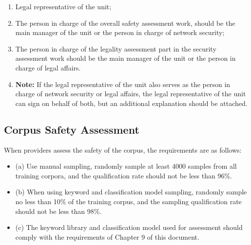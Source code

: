 \documentclass{article}
\begin{document}
\begin{itemize}
    \begin{enumerate}
        \item Legal representative of the unit;
        \item The person in charge of the overall safety assessment work, should be the main manager of the unit or the person in charge of network security;
        \item The person in charge of the legality assessment part in the security assessment work should be the main manager of the unit or the person in charge of legal affairs. 
        \item \textbf{Note:} If the legal representative of the unit also serves as the person in charge of network security or legal affairs, the legal representative of the unit can sign on behalf of both, but an additional explanation should be attached.
    \end{enumerate}
\end{itemize}

\subsection{Corpus Safety Assessment}
When providers assess the safety of the corpus, the requirements are as follows:
\begin{itemize}
    \item (a) Use manual sampling, randomly sample at least 4000 samples from all training corpora, and the qualification rate should not be less than 96\%.
    \item (b) When using keyword and classification model sampling, randomly sample no less than 10\% of the training corpus, and the sampling qualification rate should not be less than 98\%.
    \item (c) The keyword library and classification model used for assessment should comply with the requirements of Chapter 9 of this document.
\end{itemize}
\end{document}
